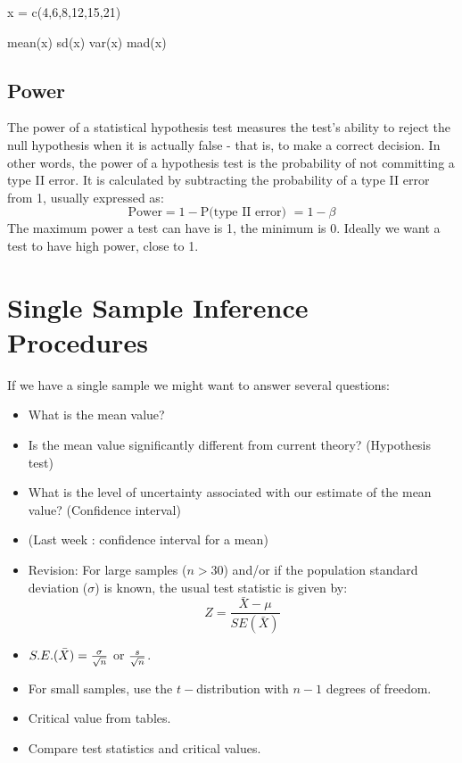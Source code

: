 x = c(4,6,8,12,15,21)

mean(x)
sd(x)
var(x)
mad(x)





\subsection{Power }
 The power of a statistical hypothesis test measures the test's ability to reject the null hypothesis when it is actually false - that is, to make a correct decision. In other words, the power of a hypothesis test is the probability of not committing a type II error. It is calculated by subtracting the probability of a type II error from 1, usually expressed as: 
\[\mbox{Power} = 1 - \mbox{P(type II error) } = 1- \beta \]The maximum power a test can have is 1, the minimum is 0. Ideally we want a test to have high power, close to 1.

\section{Single Sample Inference Procedures}
If we have a single sample we might want to answer several
questions:
\begin{itemize}
\item What is the mean value? \item Is the mean value
significantly different from current theory? (Hypothesis test)
\item What is the level of uncertainty associated with our
estimate of the mean value? (Confidence interval)
\end{itemize}

\begin{itemize}
\item (Last week : confidence interval for a mean) \item Revision:
For large samples ($n > 30$) and/or if the population standard
deviation ($\sigma$) is known, the usual test statistic is given
by: \[Z =\frac{\bar{X} - \mu}{SE(\bar{X})}\]

\item $S.E.(\bar{X}) = { \sigma \over \sqrt{n}} $ or ${s \over \sqrt{n}}$. 
\item For small samples, use the $t-$distribution with $n-1$ degrees of freedom.
\item Critical value from tables.
\item Compare test statistics and critical values.
\end{itemize}

